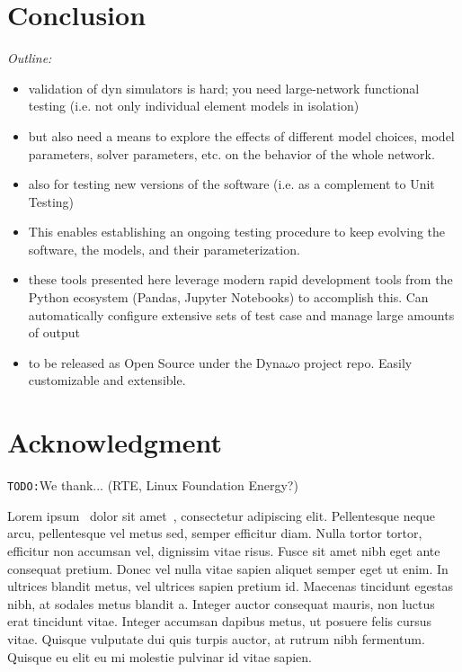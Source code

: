 \documentclass[conference]{IEEEtran}
\newcommand{\TODO}{\texttt{TODO:}}
\begin{document}
\section{Conclusion}

\begin{center}
  \itshape Outline:
  \begin{itemize}
    \item validation of dyn simulators is hard; you need large-network
          functional testing (i.e. not only individual element models in isolation)
    \item but also need a means to explore the effects of different model
          choices, model parameters, solver parameters, etc. on the behavior
          of the whole network.
    \item also for testing new versions of the software (i.e. as a
          complement to Unit Testing)
    \item This enables establishing an ongoing testing procedure to keep
          evolving the software, the models, and their parameterization.
    \item these tools presented here leverage modern rapid development
          tools from the Python ecosystem (Pandas, Jupyter Notebooks) to
          accomplish this. Can automatically configure extensive sets of test
          case and manage large amounts of output
    \item to be released as Open Source under the Dyna$\omega$o project
          repo. Easily customizable and extensible.
  \end{itemize}
\end{center}




\section*{Acknowledgment}

\TODO We thank...  (RTE, Linux Foundation Energy?)

Lorem ipsum~\cite{Fabozzi09} dolor sit amet~\cite{Fabozzi11}, consectetur
adipiscing elit. Pellentesque neque arcu, pellentesque vel metus sed, semper
efficitur diam. Nulla tortor tortor, efficitur non accumsan vel, dignissim vitae
risus. Fusce sit amet nibh eget ante consequat pretium. Donec vel nulla vitae
sapien aliquet semper eget ut enim. In ultrices blandit metus, vel ultrices
sapien pretium id. Maecenas tincidunt egestas nibh, at sodales metus blandit
a. Integer auctor consequat mauris, non luctus erat tincidunt vitae. Integer
accumsan dapibus metus, ut posuere felis cursus vitae. Quisque vulputate dui
quis turpis auctor, at rutrum nibh fermentum. Quisque eu elit eu mi molestie
pulvinar id vitae sapien.






\end{document}

